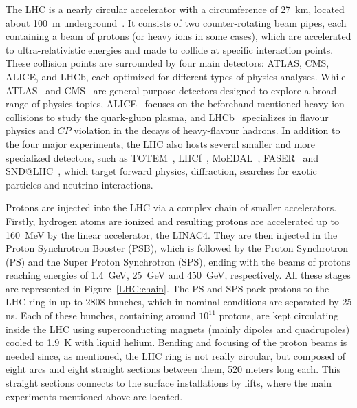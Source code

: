 The LHC is a nearly circular accelerator with a circumference of 27~km, located about 100~m underground~\cite{Evans:1129806}. It consists of two counter-rotating beam pipes, each containing a beam of protons (or heavy ions in some cases), which are accelerated to ultra-relativistic energies and made to collide at specific interaction points. These collision points are surrounded by four main detectors: ATLAS, CMS, ALICE, and LHCb, each optimized for different types of physics analyses. While ATLAS~\cite{ATLAS:exp} and CMS~\cite{CMS:exp} are general-purpose detectors designed to explore a broad range of physics topics, ALICE~\cite{ALICE:exp} focuses on the beforehand mentioned heavy-ion collisions to study the quark-gluon plasma, and LHCb~\cite{LHCb:exp} specializes in flavour physics and $CP$ violation in the decays of heavy-flavour hadrons. In addition to the four major experiments, the LHC also hosts several smaller and more specialized detectors, such as TOTEM~\cite{TOTEM}, LHCf~\cite{LHCf}, MoEDAL~\cite{MOEDAL}, FASER~\cite{FASER} and SND@LHC~\cite{SND}, which target forward physics, diffraction, searches for exotic particles and neutrino interactions.

Protons are injected into the LHC via a complex chain of smaller accelerators. Firstly, hydrogen atoms are ionized and resulting protons are accelerated up to 160~MeV by the linear accelerator, the LINAC4. They are then injected in the Proton Synchrotron Booster (PSB), which is followed by the Proton Synchrotron (PS) and the Super Proton Synchrotron (SPS), ending with the beams of protons reaching energies of 1.4~GeV, 25~GeV and 450~GeV, respectively. All these stages are represented in Figure~\ref{LHC:chain}. The PS and SPS pack protons to the LHC ring in up to 2808 bunches, which in nominal conditions are separated by 25 ns. Each of these bunches, containing around $10^{11}$ protons, are kept circulating inside the LHC using superconducting magnets (mainly dipoles and quadrupoles) cooled to 1.9~K with liquid helium. Bending and focusing of the proton beams is needed since, as mentioned, the LHC ring is not really circular, 
but composed of eight arcs and eight straight sections between them, 520 meters long each. This straight sections connects to the surface installations by lifts, where the main experiments mentioned above are located.

